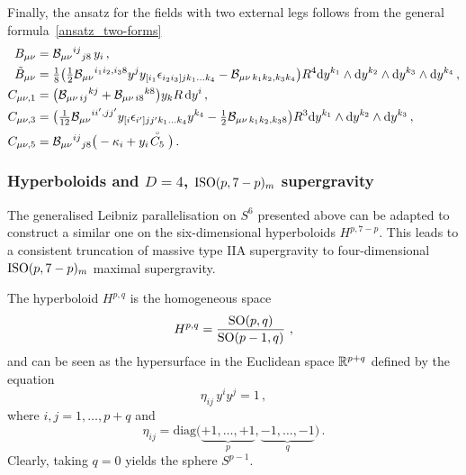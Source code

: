 \documentclass[debug]{phd}
\begin{document}
					Finally, the ansatz for the fields with two external legs follows from the general formula~\eqref{ansatz_two-forms} 
							\begin{equation}
								\begin{split}
									B_{\mu\nu}&= \mathcal{B}_{\mu\nu}{}^{ij}{}_{j8}\, y_i \,,\\
									\tilde{B}_{\mu\nu} &= \tfrac{1}{8}\big(\tfrac 12 \mathcal{B}_{\mu\nu}{}^{i_1i_2,i_38} y^j y_{[i_1}\epsilon_{i_2i_3]j k_1\ldots k_4} - \mathcal{B}_{\mu\nu\,k_1k_2,k_3k_4}\big) R^4 \mathrm{d} y^{k_1} \wedge \mathrm{d} y^{k_2} \wedge\mathrm{d} y^{k_3} \wedge\mathrm{d} y^{k_4} \,,\\
									C_{\mu\nu ,1}&= \big(\mathcal{B}_{\mu\nu\,ij}{}^{kj}+ \mathcal{B}_{\mu\nu\,i8}{}^{k8} \big) y_k R\, \mathrm{d} y^i \,,\\
									C_{\mu\nu ,3}&= \big(\tfrac{1}{12} \mathcal{B}_{\mu\nu}{}^{ii',jj'} y_{[i}\epsilon_{i']jj' k_1\ldots k_4} y^{k_4} - \tfrac12 \mathcal{B}_{\mu\nu\,k_1k_2,k_38} \big)R^3 \mathrm{d} y^{k_1}\wedge \mathrm{d} y^{k_2}\wedge \mathrm{d} y^{k_3} \,,\\
									C_{\mu\nu,5}&= \mathcal{B}_{\mu\nu}{}^{ij}{}_{j8}\big(-\kappa_i + y_i\! \stackrel{\scriptscriptstyle{\circ}}{C_5}\big) \,.
								\end{split}
							\end{equation}
			\subsubsection{\texorpdfstring{Hyperboloids and $D=4$, $\mathrm{ISO}(p,7-p)_m$ supergravity}{Hyperboloids and D=4, ISO(p,7-p)m supergravity}}\label{Hpq}
					The generalised Leibniz parallelisation on $S^6$ presented above can be adapted to construct a similar one on the six-dimensional hyperboloids $H^{p,7-p}$. 
					This leads to a consistent truncation of massive type IIA supergravity to four-dimensional $\mathrm{ISO}(p,7-p)_m$ maximal supergravity.

					The hyperboloid $H^{p,q}$ is the homogeneous space
							\begin{equation}
								H^{p,q} = \frac{\mathrm{SO}(p,q)}{\mathrm{SO}(p-1,q)}\ ,
							\end{equation}
					and can be seen as the hypersurface in the Euclidean space $\mathbb{R}^{p+q}$ defined by the equation
							\begin{equation}\label{embH}
									\eta_{ij}\, y^i y^j = 1\, ,
							\end{equation}
					where $i,j=1,\ldots,p+q$ and
							\begin{equation}
									\eta_{ij} = \mathrm{diag}\big( \underbrace{+1,\ldots, +1}_{p}, \underbrace{-1,\ldots, -1}_{q}\big)\, .
							\end{equation}
					Clearly, taking $q=0$ yields the sphere $S^{p-1}$.
\end{document}
